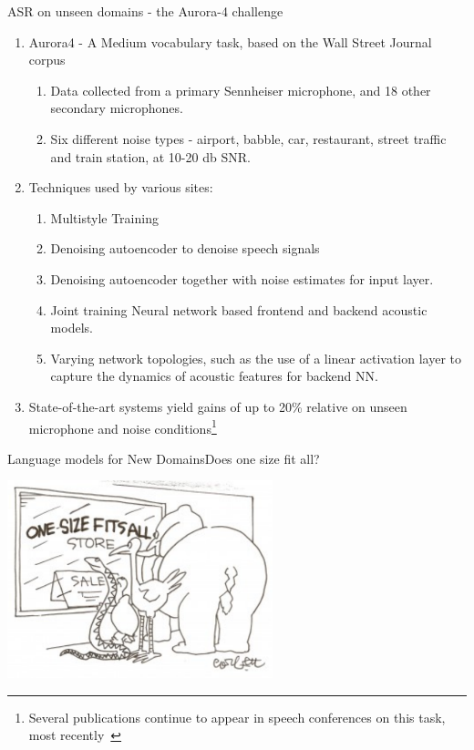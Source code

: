 \begin{frame}{ASR on unseen domains - the Aurora-4 challenge}

\begin{enumerate}
\item Aurora4 - A Medium vocabulary task, based on the Wall Street Journal corpus~\cite{hirsch2000aurora, balakrishnan2004retrospective}
\begin{enumerate}
\item Data collected from a primary Sennheiser microphone, and 18 other secondary microphones.
\item Six different noise types - airport, babble, car, restaurant, street traffic and train station, at 10-20 db SNR.
\end{enumerate}
\item Techniques used by various sites:
\begin{enumerate}
\item Multistyle Training
\item Denoising autoencoder to denoise speech signals
\item Denoising autoencoder together with noise estimates for input layer.
\item Joint training Neural network based frontend and backend acoustic models. 
\item Varying network topologies, such as the use of a linear activation layer to capture the dynamics of acoustic features for backend NN.
\end{enumerate}
\item State-of-the-art systems yield gains of up to 20\% relative on unseen microphone and noise conditions\footnote{Several publications continue to appear in speech conferences on this task, most recently~\cite{li2016exploring}}
\end{enumerate}

\end{frame}


\begin{frame} {Language models for New Domains}{Does one size fit all?}
  \begin{center}
    \includegraphics[width=77mm]{figures/onesize.pdf}
  \end{center}
\end{frame}

